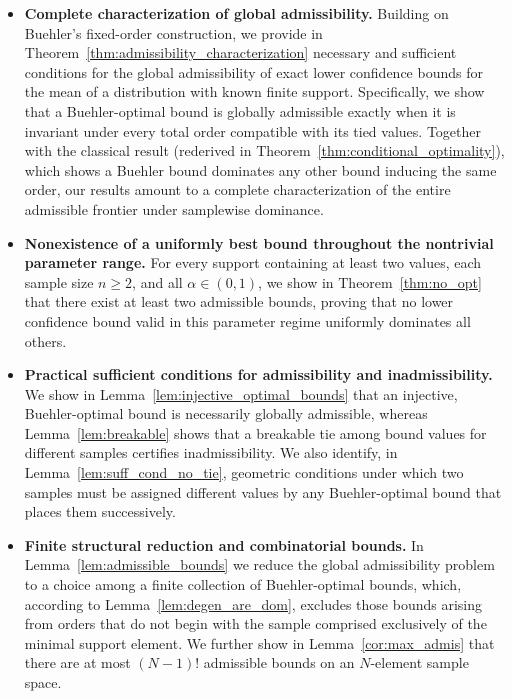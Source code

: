 \documentclass{article}
\theoremstyle{definition}
\theoremstyle{remark}
\begin{document}
\begin{itemize}
    \item \textbf{Complete characterization of global admissibility.} Building on Buehler's fixed-order construction, we provide in Theorem~\ref{thm:admissibility_characterization} necessary and sufficient conditions for the global admissibility of exact lower confidence bounds for the mean of a distribution with known finite support. Specifically, we show that a Buehler-optimal bound is globally admissible exactly when it is invariant under every total order compatible with its tied values. Together with the classical result (rederived in Theorem~\ref{thm:conditional_optimality}), which shows a Buehler bound dominates any other bound inducing the same order, our results amount to a complete characterization of the entire admissible frontier under samplewise dominance.
    \item \textbf{Nonexistence of a uniformly best bound throughout the nontrivial parameter range.} For every support containing at least two values, each sample size $n \geq 2$, and all $\alpha \in (0, 1)$, we show in Theorem~\ref{thm:no_opt} that there exist at least two admissible bounds, proving that no lower confidence bound valid in this parameter regime uniformly dominates all others.
    \item \textbf{Practical sufficient conditions for admissibility and inadmissibility.} We show in Lemma~\ref{lem:injective_optimal_bounds} that an injective, Buehler-optimal bound is necessarily globally admissible, whereas Lemma~\ref{lem:breakable} shows that a breakable tie among bound values for different samples certifies inadmissibility. We also identify, in Lemma~\ref{lem:suff_cond_no_tie}, geometric conditions under which two samples must be assigned different values by any Buehler-optimal bound that places them successively. 
    \item \textbf{Finite structural reduction and combinatorial bounds.} In Lemma~\ref{lem:admissible_bounds} we reduce the global admissibility problem to a choice among a finite collection of Buehler-optimal bounds, which, according to Lemma~\ref{lem:degen_are_dom}, excludes those bounds arising from orders that do not begin with the sample comprised exclusively of the minimal support element. We further show in Lemma~\ref{cor:max_admis} that there are at most $(N-1)!$ admissible bounds on an $N$-element sample space.
\end{itemize}
\color{black}

\end{document}
